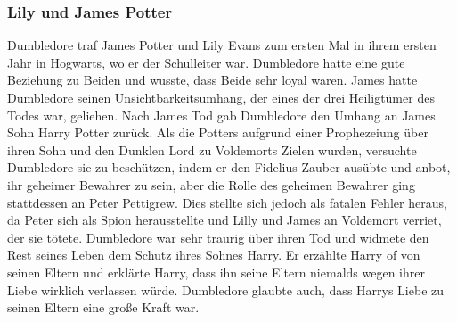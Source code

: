 \documentclass[a4paper, 10pt]{article}
\begin{document}
\subsubsection*{\large Lily und James Potter}
Dumbledore traf James Potter und Lily Evans zum ersten Mal in ihrem ersten Jahr in Hogwarts, wo er der Schulleiter war. Dumbledore hatte eine gute Beziehung zu Beiden und wusste, dass Beide sehr loyal waren. James hatte Dumbledore seinen Unsichtbarkeitsumhang, der eines der drei Heiligtümer des Todes war, geliehen. Nach James Tod gab Dumbledore den Umhang an James Sohn Harry Potter
zurück.
\vspace{10pt}
\newline
{}  
Als die Potters aufgrund einer Prophezeiung über ihren Sohn und den Dunklen Lord zu Voldemorts Zielen wurden, versuchte Dumbledore sie zu beschützen, indem er den Fidelius-Zauber ausübte und anbot, ihr geheimer Bewahrer zu sein, aber die Rolle des geheimen Bewahrer ging stattdessen an Peter Pettigrew. Dies stellte sich jedoch als fatalen Fehler heraus, da Peter sich als Spion herausstellte und Lilly und James an Voldemort verriet, der sie tötete. Dumbledore war sehr traurig über ihren Tod und widmete den Rest seines Leben dem Schutz ihres Sohnes Harry. Er erzählte Harry of von seinen Eltern und erklärte Harry, dass ihn seine Eltern niemalds wegen ihrer Liebe wirklich verlassen würde. Dumbledore glaubte auch, dass Harrys Liebe zu seinen Eltern eine große Kraft war.
\end{document}

